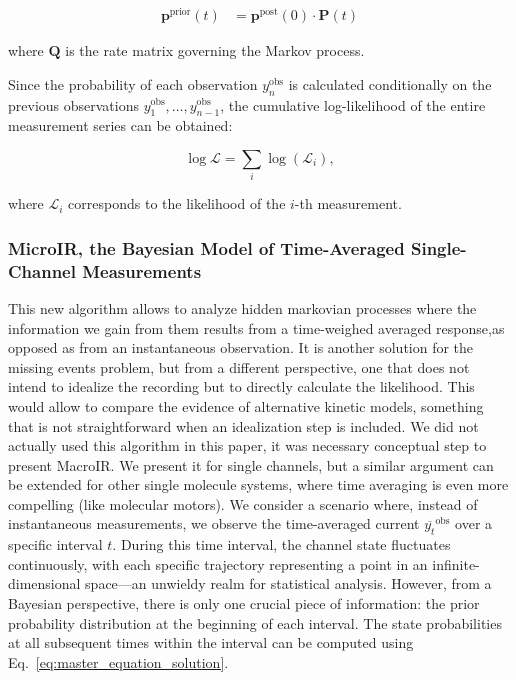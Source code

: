 \documentclass[pdflatex,sn-mathphys-num]{sn-jnl}%
\theoremstyle{thmstyleone}%
\theoremstyle{thmstyletwo}%
\theoremstyle{thmstylethree}%
\begin{document}
\begin{align}
	\boldsymbol{p}^{\text{prior}}(t) &= \boldsymbol{p}^{\text{post}}(0) \cdot \boldsymbol{P}(t)
	\label{eq:prior_update}
\end{align}

where \( \boldsymbol{Q} \) is the rate matrix governing the Markov process.

Since the probability of each observation \( {y}_n^{\text{obs}} \) is calculated conditionally on the previous observations \( {y}_1^{\text{obs}}, \dots, {y}_{n-1}^{\text{obs}} \), the cumulative log-likelihood of the entire measurement series can be obtained:

\begin{equation}
	\log \mathcal{L} = \sum_i \log (\mathcal{L}_i),
	\label{eq:total_loglikelihood}
\end{equation}

where \( \mathcal{L}_i \) corresponds to the likelihood of the \( i \)-th measurement.


\subsubsection{MicroIR, the Bayesian Model of Time-Averaged Single-Channel Measurements}

This new algorithm allows to analyze hidden markovian processes where the information we gain from them results from a time-weighed averaged response,as opposed as from an instantaneous observation. It is another solution for the missing events problem, but from a different perspective, one that does not intend to idealize the recording but to directly calculate the likelihood. This would allow to compare the evidence of alternative kinetic models, something that is not straightforward when an idealization step is included.  
We did not actually used this algorithm in this paper, it was necessary conceptual step to present MacroIR. We present it for single channels, but a similar argument can be extended for other single molecule systems, where time averaging is even more compelling (like molecular motors). 
We consider a scenario where, instead of instantaneous measurements, we observe the time-averaged current \( \overline{y_t}^{\text{obs}} \) over a specific interval \( t \). During this time interval, the channel state fluctuates continuously, with each specific trajectory representing a point in an infinite-dimensional space—an unwieldy realm for statistical analysis. However, from a Bayesian perspective, there is only one crucial piece of information: the prior probability distribution at the beginning of each interval. The state probabilities at all subsequent times within the interval can be computed using Eq.~\ref{eq:master_equation_solution}. 
\end{document}
